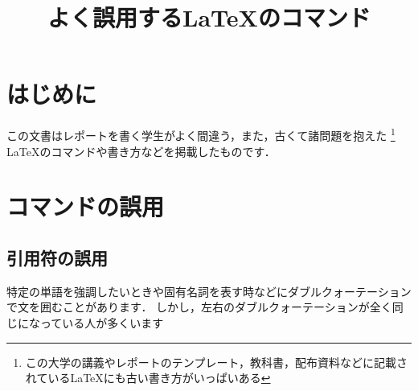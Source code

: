 \documentclass[dvipdfmx,uplatex]{jsarticle}
\title{よく誤用する\LaTeX のコマンド}
\begin{document}
\section{はじめに}
この文書はレポートを書く学生がよく間違う，また，古くて諸問題を抱えた%
\footnote{この大学の講義やレポートのテンプレート，教科書，配布資料などに記載されている\LaTeX にも古い書き方がいっぱいある}%
\LaTeX のコマンドや書き方などを掲載したものです．
\section{コマンドの誤用}
\subsection{引用符の誤用}
特定の単語を強調したいときや固有名詞を表す時などにダブルクォーテーションで文を囲むことがあります．
しかし，左右のダブルクォーテーションが全く同じになっている人が多くいます
\end{document}
